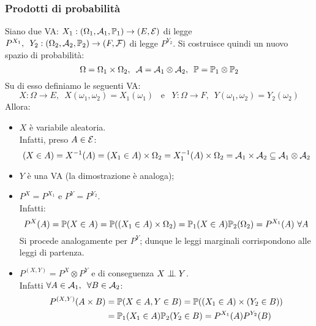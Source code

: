 \subsubsection{Prodotti di probabilità}
Siano due VA: $X_1: (\Omega_1, \mathcal A_1, \mathbb P_1) \to (E, \mathcal E)$ di legge $P^{X_1}, \enspace Y_2: (\Omega_2, \mathcal A_2, \mathbb P_2) \to (F, \mathcal F)$ di legge $P^{Y_2}$.
Si costruisce quindi un nuovo spazio di probabilità:
$$\Omega = \Omega_1 \times \Omega_2, \enspace \mathcal A= \mathcal A_1 \otimes \mathcal A_2, \enspace \mathbb P= \mathbb P_1 \otimes \mathbb P_2$$
Su di esso definiamo le seguenti VA:
$$X: \Omega \to E, \enspace X(\omega_1,\omega_2)=X_1(\omega_1) \enspace \text{ e } \enspace Y: \Omega \to F, \enspace Y(\omega_1, \omega_2)=Y_2(\omega_2)$$
Allora:
\begin{itemize}
\item $X$ è variabile aleatoria. \\
Infatti, preso $A \in \mathcal E$:
$$(X \in A)=X^{-1}(A)=(X_1 \in A) \times \Omega_2= X_1^{-1}(A) \times \Omega_2 = \mathcal A_1 \times \mathcal A_2 \subseteq \mathcal A_1 \otimes \mathcal A_2$$
\item $Y$ è una VA (la dimostrazione è analoga);
\item $P^X=P^{X_1}$ e $P^Y=P^{Y_2}$. \\
Infatti:
$$P^X(A) = \PP(X \in A) = \PP((X_1 \in A) \times \Omega_2) = \PP_1(X \in A)\PP_2(\Omega_2)= P^{X_1}(A) \ \forall A$$
Si procede analogamente per $P^Y$; dunque le leggi marginali corrispondono alle leggi di partenza.
\item $P^{(X,Y)}=P^X \otimes P^Y$ e di conseguenza $X \indep Y$. \\
Infatti $\forall A \in \mathcal A_1, \enspace \forall B \in \mathcal A_2$:
\begin{align*}
  P^{(X,Y)}(A \times B)
  &= \mathbb P(X \in A, Y \in B)
  = \mathbb P((X_1 \in A) \times (Y_2 \in B)) \\
  &= \mathbb P_1(X_1 \in A) \mathbb P_2(Y_2 \in B)
  = P^{X_1}(A)P^{Y_2}(B) \\
\end{align*}
\end{itemize}

